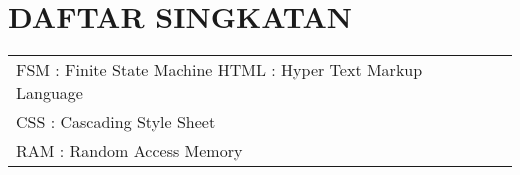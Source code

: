 \chapter*{DAFTAR SINGKATAN}

\begin{table}
\begin{tabular}{l l l}
FSM : Finite State Machine
HTML : Hyper Text Markup Language\\
CSS : Cascading Style Sheet\\
RAM : Random Access Memory
\end{tabular}
\end{table}
